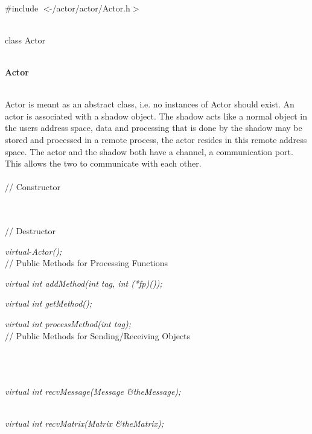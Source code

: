 
   \\
\#include $<\tilde{ }$/actor/actor/Actor.h$>$  


  \\
class Actor 


 \\
{\bf Actor} 


  \\
\indent Actor is meant as an abstract class, i.e. no instances of Actor
should exist. An actor is associated with a shadow object. The shadow
acts like a normal object in the users address space, data and
processing that is done by the shadow may be stored and processed in a
remote process, the actor resides in this remote address space. The
actor and the shadow both have a channel, a communication port. This
allows the two to communicate with each other.\\

  \\
// Constructor  

  \\  \\
// Destructor 

{\em virtual $\tilde{ }$Actor();}\\ 

// Public Methods for Processing Functions 

{\em virtual int addMethod(int tag, int (*fp)());}

{\em virtual int  getMethod();} 

{\em virtual int  processMethod(int tag);}\\ 

// Public Methods for Sending/Receiving Objects

\\
\\
\\
{\em virtual int recvMessage(Message \&theMessage);} 

\\
{\em virtual int recvMatrix(Matrix \&theMatrix);} 

